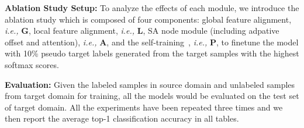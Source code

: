 \documentclass{article}
\begin{document}
\textbf{Ablation Study Setup: }To analyze the effects of each module, we introduce the ablation study which is composed of four components: global feature alignment, \textit{i.e.,} \textbf{G}, local feature alignment, \textit{i.e.,} \textbf{L}, SA node module (including adpative offset and attention), \textit{i.e.,} \textbf{A}, and the self-training~\cite{zou2018unsupervised}, \textit{i.e.,} \textbf{P}, to finetune the model with 10\% pseudo target labels generated from the target samples with the highest softmax scores. 

\textbf{Evaluation: } Given the labeled samples in source domain and unlabeled samples from target domain for training, all the models would be evaluated on the test set of target domain. All the experiments have been repeated three times and we then report the average top-1 classification accuracy in all tables.  
\end{document}
